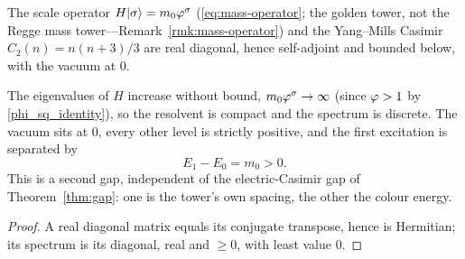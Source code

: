 \begin{proposition}\label{prop:operators}
The scale operator $H\lvert\sigma\rangle=m_0\varphi^{\sigma}$ (\eqref{eq:mass-operator}; the golden
tower, not the Regge mass tower---Remark~\ref{rmk:mass-operator}) and the Yang--Mills Casimir $C_2(n)=n(n+3)/3$ are real diagonal, hence self-adjoint and bounded below,
with the vacuum at $0$.


\end{proposition}

\begin{proposition}\label{prop:spectrum}
The eigenvalues of $H$ increase without bound, $m_0\varphi^{\sigma}\to\infty$ (since $\varphi>1$
by \eqref{phi_sq_identity}), so
the resolvent is compact and the spectrum is discrete. The vacuum sits at $0$, every other level is
strictly positive, and the first excitation is separated by
\begin{equation}\label{eq:tower-gap}
  E_1-E_0=m_0>0 .
\end{equation}
This is a second gap, independent of the electric-Casimir gap of Theorem~\ref{thm:gap}: one is the
tower's own spacing, the other the colour energy.


\end{proposition}
\begin{proof}
A real diagonal matrix equals its conjugate transpose, hence is Hermitian; its spectrum is its
diagonal, real and $\ge0$, with least value $0$.
\end{proof}

